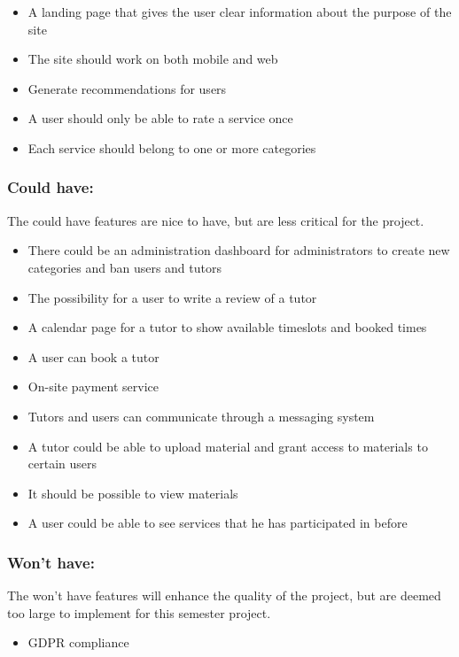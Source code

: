 \begin{itemize}
    \item A landing page that gives the user clear information about the purpose of the site
    \item The site should work on both mobile and web
    \item Generate recommendations for users
    \item A user should only be able to rate a service once
    \item Each service should belong to one or more categories
\end{itemize}

\subsubsection{Could have:}
The could have features are nice to have, but are less critical for the project.

\begin{itemize}
    \item There could be an administration dashboard for administrators to create new categories and ban users and tutors
    \item The possibility for a user to write a review of a tutor
    \item A calendar page for a tutor to show available timeslots and booked times
    \item A user can book a tutor
    \item On-site payment service
    \item Tutors and users can communicate through a messaging system
    \item A tutor could be able to upload material and grant access to materials to certain users
    \item It should be possible to view materials
    \item A user could be able to see services that he has participated in before
\end{itemize}

\subsubsection{Won't have:}
The won't have features will enhance the quality of the project, but are deemed too large to implement for this semester project.
\begin{itemize}
    \item GDPR compliance
\end{itemize}
